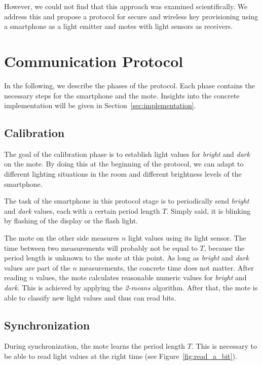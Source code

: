 \documentclass{sig-alternate} %
\begin{document}
However, we could not find that this approach was examined scientifically.
We address this and propose a protocol for secure and wireless key provisioning using a smartphone as a light emitter and motes with light sensors as receivers.

\section{Communication Protocol}
\label{sec:communication_protocol}

In the following, we describe the phases of the protocol.
Each phase contains the necessary steps for the smartphone and the mote.
Insights into the concrete implementation will be given in Section~\ref{sec:implementation}.

\subsection{Calibration}
\label{sub:calibration}

The goal of the calibration phase is to establish light values for \textit{bright} and \textit{dark} on the mote.
By doing this at the beginning of the protocol, we can adapt to different lighting situations in the room and different brightness levels of the smartphone.

The task of the smartphone in this protocol stage is to periodically send \textit{bright} and \textit{dark} values, each with a certain period length $T$.
Simply said, it is blinking by flashing of the display or the flash light.

The mote on the other side measures $n$ light values using its light sensor.
The time between two measurements will probably not be equal to $T$, because the period length is unknown to the mote at this point.
As long as \textit{bright} and \textit{dark} values are part of the $n$ measurements, the concrete time does not matter.
After reading $n$ values, the mote calculates reasonable numeric values for \textit{bright} and \textit{dark}.
This is achieved by applying the \mbox{\textit{2-means}} algorithm.
After that, the mote is able to classify new light values and thus can read bits.

\subsection{Synchronization}
\label{sub:synchronization}

During synchronization, the mote learns the period length $T$.
This is necessary to be able to read light values at the right time (see Figure~\ref{fig:read_a_bit}).
\end{document}
